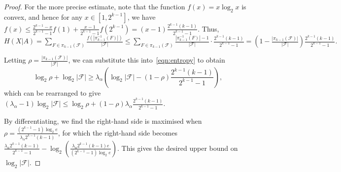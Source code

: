 \documentclass[10pt,a4paper]{amsart}
\newcommand{\F}{\mathcal{F}}
\begin{document}
\begin{proof}
    For the more precise estimate, note that the function $f(x) = x \log_2 x$ is convex, and hence for any $x \in [1, 2^{k-1}]$, we have $f(x) \le \frac{2^{k-1}-x}{2^{k-1} - 1} f(1) + \frac{x - 1}{2^{k-1}-1} f(2^{k-1}) = (x-1)\frac{2^{k-1}(k-1)}{2^{k-1}-1}$. Thus, $H(X|A) = \sum_{F \in \pi_{k-1}(\F)} \frac{f(|\pi_{k-1}^{-1}(F)|)}{|\F|} \le \sum_{F \in \pi_{k-1}(\F)} \frac{|\pi_{k-1}^{-1}(F)|-1}{|\F|} \cdot \frac{2^{k-1}(k-1)}{2^{k-1} - 1} = \left( 1 - \frac{|\pi_{k-1}(\F)|}{|\F|} \right) \frac{2^{k-1}(k-1)}{2^{k-1}-1}.$

    Letting $\rho = \frac{|\pi_{k-1}(\F)|}{|\F|}$, we can substitute this into~\eqref{eqn:entropy} to obtain
    \[ \log_2 \rho + \log_2 |\F| \ge \lambda_\alpha \left( \log_2 |\F| - (1 - \rho) \frac{2^{k-1}(k-1)}{2^{k-1} - 1} \right), \]
    which can be rearranged to give $(\lambda_\alpha - 1) \log_2 |\F| \le \log_2 \rho + (1 - \rho) \lambda_\alpha \frac{2^{k-1}(k-1)}{2^{k-1}-1}$.
    
    By differentiating, we find the right-hand side is maximised when $\rho = \frac{(2^{k-1}-1) \log_2 e}{\lambda_\alpha 2^{k-1} (k-1)}$, for which the right-hand side becomes $\frac{\lambda_\alpha 2^{k-1}(k-1)}{2^{k-1}-1} - \log_2 \left( \frac{\lambda_\alpha 2^{k-1}(k-1)e}{(2^{k-1}-1)\log_2 e}\right)$. This gives the desired upper bound on $\log_2 |\F|$.
    \end{proof}
\end{document}
